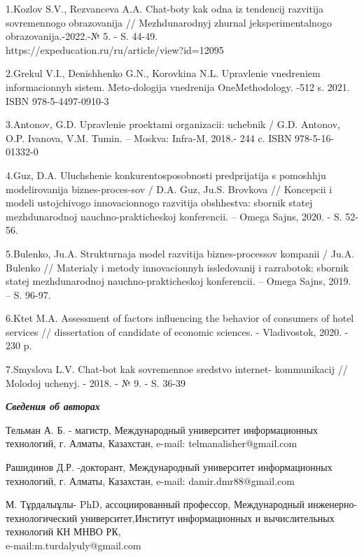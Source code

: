 \begin{noparindent}

1.Kozlov S.V., Rezvanceva A.A. Chat-boty kak odna iz tendencij razvitija
sovremennogo obrazovanija // Mezhdunarodnyj zhurnal
jeksperimental\textquotesingle nogo obrazovanija.-2022.-№ 5. - S. 44-49.
\\https://expeducation.ru/ru/article/view?id=12095

2.Grekul V.I., Denishhenko G.N., Korovkina N.L. Upravlenie vnedreniem
informacionnyh sistem. Meto-dologija vnedrenija OneMethodology. -512 s.
2021. ISBN 978-5-4497-0910-3

3.Antonov, G.D. Upravlenie proektami organizacii: uchebnik / G.D.
Antonov, O.P. Ivanova, V.M. Tumin. -- Moskva: Infra-M, 2018.- 244 c.
ISBN 978-5-16-01332-0

4.Guz\textquotesingle, D.A. Uluchshenie konkurentosposobnosti
predprijatija s pomoshh\textquotesingle ju modelirovanija
biznes-proces-sov / D.A. Guz\textquotesingle, Ju.S. Brovkova // Koncepcii
i modeli ustojchivogo innovacionnogo razvitija obshhestva: sbornik
statej mezhdunarodnoj nauchno-prakticheskoj konferencii. -- Omega Sajns,
2020. - S. 52-56.

5.Bulenko, Ju.A. Strukturnaja model\textquotesingle{} razvitija
biznes-processov kompanii / Ju.A. Bulenko // Materialy i metody
innovacionnyh issledovanij i razrabotok: sbornik statej mezhdunarodnoj
nauchno-prakticheskoj konferencii. -- Omega Sajns, 2019. -- S. 96-97.

6.Ktet M.A. Assessment of factors influencing the behavior of consumers
of hotel services // dissertation of candidate of economic sciences. -
Vladivostok, 2020. - 230 p.

7.Smyslova L.V. Chat-bot kak sovremennoe sredstvo internet- kommunikacij
// Molodoj uchenyj. - 2018. - № 9. - S. 36-39
\end{noparindent}

\emph{{\bfseries Сведения об авторах}}
\begin{noparindent}

Тельман А. Б. - магистр, Международный университет информационных
технологий, г. Алматы, Казахстан, e-mail: telmanalisher@gmail.com

Рашидинов Д.Р. -докторант, Международный университет информационных
технологий, г. Алматы, Казахстан, e-mail: damir.dmr88@gmail.com

М. Тұрдалыұлы- PhD, ассоциированный профессор, Международный инженерно-технологический
университет,Институт информационных и вычислительных технологий КН МНВО РК, \\e-mail:m.turdalyuly@gmail.com
\end{noparindent}

